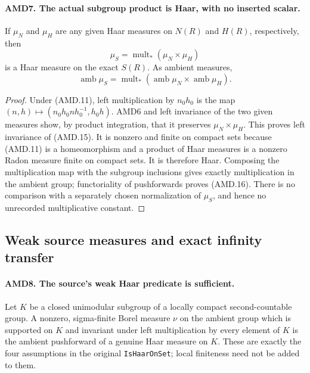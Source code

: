 \documentclass[11pt,a4paper]{article}
\numberwithin{equation}{section}
\theoremstyle{remark}\newtheorem{remark}[theorem]{Remark}
\begin{document}
\paragraph{AMD7. The actual subgroup product is Haar, with no inserted scalar.}
\label{claim:AMD7}
If \(\mu_N\) and \(\mu_H\) are any given Haar measures on
\(N(R)\) and \(H(R)\), respectively, then
\[
       \mu_S=\operatorname{mult}_*(\mu_N\times\mu_H)
 \tag{AMD.15}
\]
is a Haar measure on the exact \(S(R)\).  As ambient measures,
\[
 \operatorname{amb}\mu_S
   =\operatorname{mult}_*
       (\operatorname{amb}\mu_N\times\operatorname{amb}\mu_H).
 \tag{AMD.16}
\]

\begin{proof}
Under (AMD.11), left multiplication by \(n_0h_0\) is the map
\((n,h)\mapsto(n_0h_0nh_0^{-1},h_0h)\).  AMD6 and left
invariance of the two given measures show, by product integration,
that it preserves \(\mu_N\times\mu_H\).  This proves left
invariance of (AMD.15).  It is nonzero and finite on compact
sets because (AMD.11) is a homeomorphism and a product of Haar
measures is a nonzero Radon measure finite on compact sets.
It is therefore Haar.  Composing the multiplication map with
the subgroup inclusions gives exactly multiplication in the
ambient group; functoriality of pushforwards proves (AMD.16).
There is no comparison with a separately chosen normalization
of \(\mu_S\), and hence no unrecorded multiplicative constant.
\end{proof}

\subsection{Weak source measures and exact infinity transfer}

\paragraph{AMD8. The source's weak Haar predicate is sufficient.}
\label{claim:AMD8}
Let \(K\) be a closed unimodular subgroup of a locally compact
second-countable group.  A nonzero, sigma-finite Borel measure
\(\nu\) on the ambient group which is supported on \(K\)
and invariant under left multiplication by every element of
\(K\) is the ambient pushforward of a genuine Haar measure
on \(K\).  These are exactly the four assumptions in the
original \texttt{Is\allowbreak Haar\allowbreak On\allowbreak Set}; local finiteness need not be
added to them.
\end{document}
